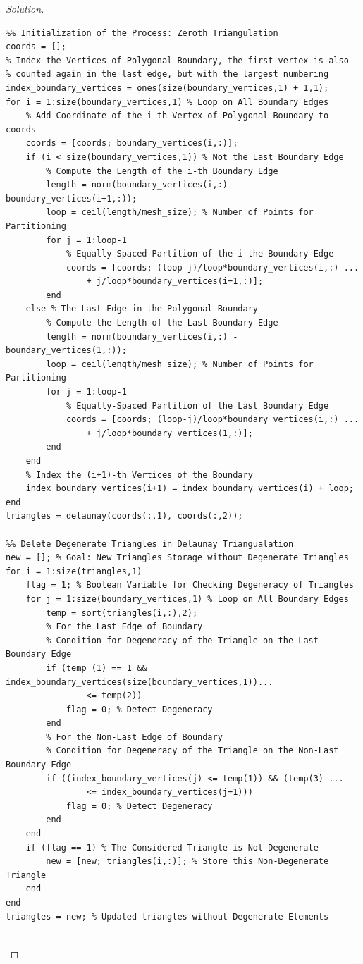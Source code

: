 \documentclass[11pt,a4paper,center,notitlepage]{article}
\numberwithin{equation}{section}
\begin{document}
\begin{proof}[Solution]
\begin{verbatim}
%% Initialization of the Process: Zeroth Triangulation
coords = [];
% Index the Vertices of Polygonal Boundary, the first vertex is also
% counted again in the last edge, but with the largest numbering
index_boundary_vertices = ones(size(boundary_vertices,1) + 1,1);
for i = 1:size(boundary_vertices,1) % Loop on All Boundary Edges
    % Add Coordinate of the i-th Vertex of Polygonal Boundary to coords
    coords = [coords; boundary_vertices(i,:)];
    if (i < size(boundary_vertices,1)) % Not the Last Boundary Edge
        % Compute the Length of the i-th Boundary Edge
        length = norm(boundary_vertices(i,:) - boundary_vertices(i+1,:));
        loop = ceil(length/mesh_size); % Number of Points for Partitioning
        for j = 1:loop-1
            % Equally-Spaced Partition of the i-the Boundary Edge
            coords = [coords; (loop-j)/loop*boundary_vertices(i,:) ...
                + j/loop*boundary_vertices(i+1,:)];
        end
    else % The Last Edge in the Polygonal Boundary
        % Compute the Length of the Last Boundary Edge
        length = norm(boundary_vertices(i,:) - boundary_vertices(1,:));
        loop = ceil(length/mesh_size); % Number of Points for Partitioning
        for j = 1:loop-1
            % Equally-Spaced Partition of the Last Boundary Edge
            coords = [coords; (loop-j)/loop*boundary_vertices(i,:) ...
                + j/loop*boundary_vertices(1,:)];
        end
    end
    % Index the (i+1)-th Vertices of the Boundary
    index_boundary_vertices(i+1) = index_boundary_vertices(i) + loop;
end
triangles = delaunay(coords(:,1), coords(:,2));

%% Delete Degenerate Triangles in Delaunay Triangualation
new = []; % Goal: New Triangles Storage without Degenerate Triangles
for i = 1:size(triangles,1)
    flag = 1; % Boolean Variable for Checking Degeneracy of Triangles
    for j = 1:size(boundary_vertices,1) % Loop on All Boundary Edges
        temp = sort(triangles(i,:),2);
        % For the Last Edge of Boundary
        % Condition for Degeneracy of the Triangle on the Last Boundary Edge
        if (temp (1) == 1 && index_boundary_vertices(size(boundary_vertices,1))...
                <= temp(2))
            flag = 0; % Detect Degeneracy
        end
        % For the Non-Last Edge of Boundary
        % Condition for Degeneracy of the Triangle on the Non-Last Boundary Edge
        if ((index_boundary_vertices(j) <= temp(1)) && (temp(3) ...
                <= index_boundary_vertices(j+1)))
            flag = 0; % Detect Degeneracy
        end
    end
    if (flag == 1) % The Considered Triangle is Not Degenerate
        new = [new; triangles(i,:)]; % Store this Non-Degenerate Triangle
    end
end
triangles = new; % Updated triangles without Degenerate Elements


\end{verbatim}
\end{proof}
\end{document}
